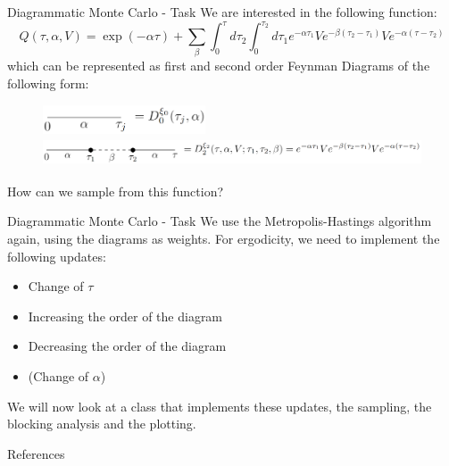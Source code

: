 \documentclass[10pt,xcolor=table, aspectratio=1610]{beamer}
\begin{document}
\begin{frame}[containsverbatim]{Diagrammatic Monte Carlo - Task}
We are interested in the following function:
\begin{equation*}
  Q(\tau, \alpha, V)=\exp (-\alpha \tau)+\sum_\beta \int_0^\tau d \tau_2 \int_0^{\tau_2} d \tau_1 e^{-\alpha \tau_1} V e^{-\beta\left(\tau_2-\tau_1\right)} V e^{-\alpha\left(\tau-\tau_2\right)}
\end{equation*}
which can be represented as first and second order \alert{Feynman Diagrams} of the following form:
\begin{figure}
  \centering
  \includegraphics[height=24pt]{images/feynman1.png}

  \includegraphics[height=24pt]{images/feynman2.png}
\end{figure}
How can we sample from this function?
\end{frame}

\begin{frame}[containsverbatim]{Diagrammatic Monte Carlo - Task}
  We use the \alert{Metropolis-Hastings algorithm} again, using the diagrams as 
  weights. For ergodicity, we need to implement the following updates:
  \begin{itemize}
    \item Change of $\tau$
    \item Increasing the order of the diagram
    \item Decreasing the order of the diagram
    \item (Change of $\alpha$)
  \end{itemize}
We will now look at a class that implements these updates, the sampling, the 
blocking analysis and the plotting.
\end{frame}


\renewcommand\appendixname{Appendix}
\appendix


{\insertbiblabel}

\begin{frame}[allowframebreaks]{References}
  
  
\end{frame}
\end{document}
